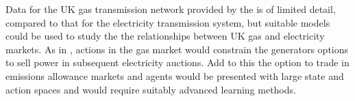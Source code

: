 Data for the UK gas transmission network provided by the  is
of limited detail, compared to that for the electricity transmission system, but
suitable models could be used to study the the relationships between UK gas and
electricity markets.  As in , actions in the gas market would
constrain the generators options to sell power in subsequent electricity
auctions.  Add to this the option to trade in emissions allowance markets and
agents would be presented with large state and action spaces and would require
suitably advanced learning methods.





